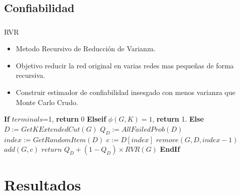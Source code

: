 \subsection{Confiabilidad}
\begin{frame}\frametitle{}
\begin{block}{RVR}
\begin{scriptsize}
\begin{itemize}
 \item Metodo Recursivo de Reducción de Varianza.
 \item Objetivo reducir la red original en varias redes mas pequeñas de forma recursiva.
 \item Construir estimador de confiabilidad insesgado con menos varianza que Monte Carlo Crudo.
\end{itemize} 
\end{scriptsize}
\end{block}
\begin{block}{}
\begin{algorithm}[H]
\caption{$RVR(G,K,p_v,p_e)$}
\begin{algorithmic}[1]
\begin{tiny}
\STATE \textbf{If} $terminals$=1, \textbf{return} $0$
\STATE \textbf{Elseif} $\phi(G,K)=1$, \textbf{return} 1.
\STATE \textbf{Else} 
\STATE $D := GetKExtendedCut(G)$
\STATE $Q_{D} := AllFailedProb(D)$
\STATE $index := GetRandomItem(D)$
\STATE $c := D[index]$
\STATE $remove(G,D, index - 1)$
\STATE $add(G, c)$
\STATE $return \, \, Q_{D} + (1 - Q_{D})\times RVR(G)$
\STATE \textbf{EndIf}
\end{tiny}
\end{algorithmic}
\end{algorithm}
\end{block}
\end{frame}

\section{Resultados}
